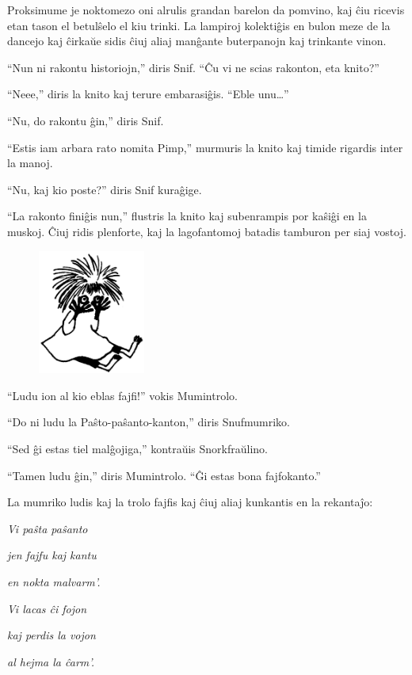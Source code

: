 Proksimume je noktomezo oni alrulis grandan barelon da pomvino, kaj ĉiu ricevis etan tason el betulŝelo el kiu trinki. La lampiroj kolektiĝis en bulon meze de la dancejo kaj ĉirkaŭe sidis ĉiuj aliaj manĝante buterpanojn kaj trinkante vinon.

``Nun ni rakontu historiojn,'' diris Snif. ``Ĉu vi ne scias rakonton, eta knito?''

``Neee,'' diris la knito kaj terure embarasiĝis. ``Eble unu{\ldots}''

``Nu, do rakontu ĝin,'' diris Snif.

``Estis iam arbara rato nomita Pimp,'' murmuris la knito kaj timide rigardis inter la manoj.

``Nu, kaj kio poste?'' diris Snif kuraĝige.

``La rakonto finiĝis nun,'' flustris la knito kaj subenrampis por kaŝiĝi en la muskoj. Ĉiuj ridis plenforte, kaj la lagofantomoj batadis tamburon per siaj vostoj.

\begin{figure}[htbp]
\centering
\includegraphics[width=100pt,height=116pt]{6-8.png}
\caption{}
\label{6-8}
\end{figure}

``Ludu ion al kio eblas fajfi!'' vokis Mumintrolo.

``Do ni ludu la Paŝto-paŝanto-kanton,'' diris Snufmumriko.

``Sed ĝi estas tiel malĝojiga,'' kontraŭis Snorkfraŭlino.

``Tamen ludu ĝin,'' diris Mumintrolo. ``Ĝi estas bona fajfokanto.''

La mumriko ludis kaj la trolo fajfis kaj ĉiuj aliaj kunkantis en la rekantaĵo:

\emph{Vi paŝta paŝanto}

\emph{jen fajfu kaj kantu}

\emph{en nokta malvarm'.}

\emph{Vi lacas ĉi fojon}

\emph{kaj perdis la vojon}

\emph{al hejma la ĉarm'.}

